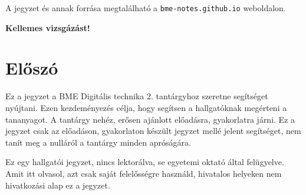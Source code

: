 


\lstset{language=[x86masm]Assembler} %
\graphicspath{{./images/}} %


\segitettek{} %



\begin{titlepage}
		\centering
		\vspace{5cm}\par
		\maketitle
		\large A jegyzet és annak forrása megtalálható a \texttt{bme-notes.github.io} weboldalon.
		\vfill
		\normalsize
\end{titlepage}


\noindent \textbf{Kellemes vizsgázást!}

\tableofcontents{}

\section{Előszó}
Ez a jegyzet a BME Digitális technika 2. tantárgyhoz szeretne segítséget nyújtani. Ezen kezdeményezés célja, hogy segítsen a hallgatóknak megérteni a tananyagot. A tantárgy nehéz, erősen ajánlott előadásra, gyakorlatra járni. Ez a jegyzet csak az előadáson, gyakorlaton készült jegyzet mellé jelent segítséget, nem tanít meg a nulláról a tantárgy minden apróságára.

Ez egy hallgatói jegyzet, nincs lektorálva, se egyetemi oktató által felügyelve. Amit itt olvasol, azt csak saját felelősségre használd, hivatalos helyeken nem hivatkozási alap ez a jegyzet.



